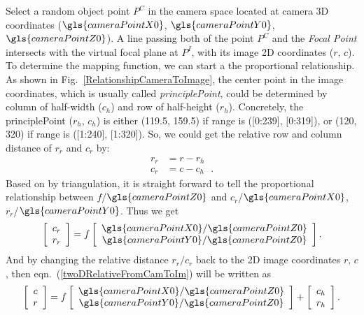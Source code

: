 Select a random object point \(P^C\) in the camera space located at camera \gls{3D} coordinates (\(\gls{cameraPointX0}\), \(\gls{cameraPointY0}\), \(\gls{cameraPointZ0}\)). A line passing both of the point \(P^C\) and the \emph{Focal Point} intersects with the virtual focal plane at \(P^I\), with its image 2D coordinates (\(r, \, c\)). To determine the mapping function, we can start a the proportional relationship. As shown in Fig.~\ref{RelationshipCameraToImage}, the center point in the image coordinates, which is usually called \emph{\gls{principlePoint}}, could be determined by column of half-width (\(c_h\)) and row of half-height (\(r_h\)). Concretely, the \gls{principlePoint} (\(r_h\), \(c_h\)) is either (119.5, 159.5) if range is ([0:239], [0:319]), or (120, 320) if range is ([1:240], [1:320]). So, we could get the relative row and column distance of  \(r_r\) and \(c_r\) by:
%
\begin{equation}
\begin{aligned}
r_r &= r - r_h%
\\%
c_r &= c - c_h \ \ \ .%
\end{aligned}
\label{relativeCRforProportional}
\end{equation}%
%
Based on by triangulation, it is straight forward to tell the proportional relationship between \(f\)/\(\gls{cameraPointZ0}\) and \(c_r\)/\(\gls{cameraPointX0}\), \(r_r\)/\(\gls{cameraPointY0}\). Thus we get
%
\begin{equation}
\left[ \begin{array}{c} c_r \\ r_r \end{array} \right] %
= f %
\left[ \begin{array}{c} \gls{cameraPointX0}/\gls{cameraPointZ0} \\ \gls{cameraPointY0}/\gls{cameraPointZ0} \end{array} \right]  .%
\label{twoDRelativeFromCamToIm}
\end{equation}
\noindent
And by changing the relative distance \(r_r / c_r\) back to the 2D image coordinates \(r, \, c\), then eqn.~(\ref{twoDRelativeFromCamToIm}) will be written as
%
\begin{equation}
\left[ \begin{array}{c} c \\ r \end{array} \right] %
= f %
\left[ \begin{array}{c} \gls{cameraPointX0}/\gls{cameraPointZ0} \\ \gls{cameraPointY0}/\gls{cameraPointZ0} \end{array} \right]%
+
\left[ \begin{array}{c}  c_h \\  r_h \end{array} \right] .%
\label{linearRelationFromCamToIm}
\end{equation}
